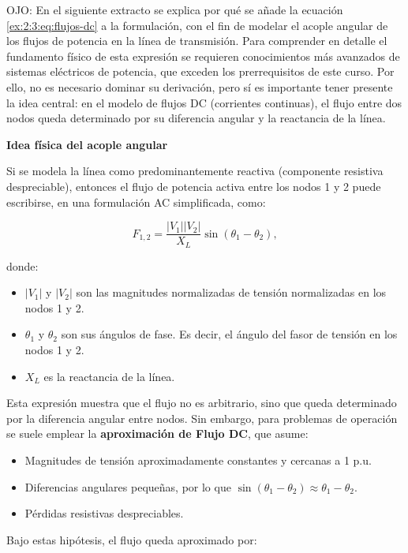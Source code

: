 \begin{enumerate}
OJO: En el siguiente extracto se explica por qué se añade la ecuación \eqref{ex:2:3:eq:flujos-dc} a la formulación, con el fin de modelar el acople angular de los flujos de potencia en la línea de transmisión. Para comprender en detalle el fundamento físico de esta expresión se requieren conocimientos más avanzados de sistemas eléctricos de potencia, que exceden los prerrequisitos de este curso. Por ello, no es necesario dominar su derivación, pero sí es importante tener presente la idea central: en el modelo de flujos DC (corrientes continuas), el flujo entre dos nodos queda determinado por su diferencia angular y la reactancia de la línea.

\textbf{Idea física del acople angular}

Si se modela la línea como predominantemente reactiva (componente resistiva despreciable), entonces el flujo de potencia activa entre los nodos 1 y 2 puede escribirse, en una formulación AC simplificada, como:

\begin{equation}
    F_{1,2} = \frac{|V_1||V_2|}{X_L}\sin(\theta_1-\theta_2),
\end{equation}

donde:
\begin{itemize}
    \item $|V_1|$ y $|V_2|$ son las magnitudes normalizadas de tensión normalizadas en los nodos 1 y 2.
    \item $\theta_1$ y $\theta_2$ son sus ángulos de fase. Es decir, el ángulo del fasor de tensión en los nodos 1 y 2.
    \item $X_L$ es la reactancia de la línea.
\end{itemize}

Esta expresión muestra que el flujo no es arbitrario, sino que queda determinado por la diferencia angular entre nodos. Sin embargo, para problemas de operación se suele emplear la \textbf{aproximación de Flujo DC}, que asume:
\begin{itemize}
    \item Magnitudes de tensión aproximadamente constantes y cercanas a 1 p.u.
    \item Diferencias angulares pequeñas, por lo que $\sin(\theta_1-\theta_2)\approx \theta_1-\theta_2$.
    \item Pérdidas resistivas despreciables.
\end{itemize}

Bajo estas hipótesis, el flujo queda aproximado por:


\end{enumerate}
